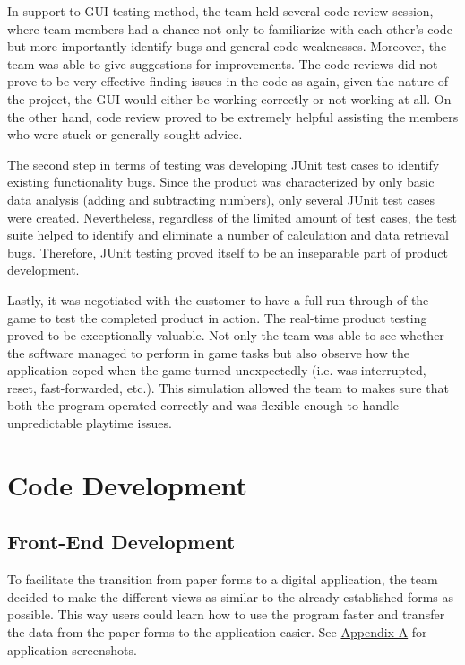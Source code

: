 \documentclass{l3proj}
\begin{document}
In support to GUI testing method, the team held several code review session, where team members had a chance not only to familiarize with each other's code but more importantly identify bugs and general code weaknesses. Moreover, the team was able to give suggestions for improvements. The code reviews did not prove to be very effective finding issues in the code as again, given the nature of the project, the GUI would either be working correctly or not working at all. On the other hand, code review proved to be extremely helpful assisting the members who were stuck or generally sought advice.

The second step in terms of testing was developing JUnit test cases to identify existing functionality bugs. Since the product was characterized by only basic data analysis (adding and subtracting numbers), only several JUnit test cases were created. Nevertheless, regardless of the limited amount of test cases, the test suite helped to identify and eliminate a number of calculation and data retrieval bugs. Therefore, JUnit testing proved itself to be an inseparable part of product development.

Lastly, it was negotiated with the customer to have a full run-through of the game to test the completed product in action. The real-time product testing proved to be exceptionally valuable. Not only the team was able to see whether the software managed to perform in game tasks but also observe how the application coped when the game turned unexpectedly (i.e. was interrupted, reset, fast-forwarded, etc.). This simulation allowed the team to makes sure that both the program operated correctly and was flexible enough to handle unpredictable playtime issues.
\section{Code Development}
\label{sec:development}
\subsection{Front-End Development}

To facilitate the transition from paper forms to a digital application, the team decided to make the different views as similar to the already established forms as possible. This way users could learn how to use the program faster and transfer the data from the paper forms to the application easier. See \hyperref[sec:appendix]{Appendix A} for application screenshots.
\end{document}
